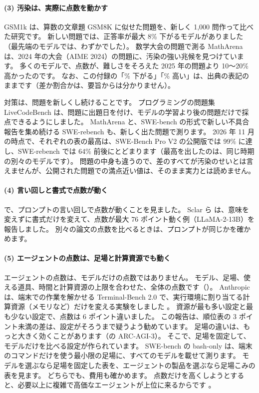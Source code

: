 \paragraph{(3) 汚染は、実際に点数を動かす}
GSM1k \cite{zhang2024gsm1k} は、算数の文章題 GSM8K に似せた問題を、新しく 1,000 問作って比べた研究です。
新しい問題では、正答率が最大 8\% 下がるモデルがありました（最先端のモデルでは、わずかでした）。
数学大会の問題で測る MathArena \cite{balunovic2025matharena} は、2024 年の大会（AIME 2024）の問題に、汚染の強い兆候を見つけています。
多くのモデルで、点数が、難しさをそろえた 2025 年の問題より 10〜20\% 高かったのです。
なお、この付録の「\% 下がる」「\% 高い」は、出典の表記のままです（差か割合かは、要旨からは分かりません）。

対策は、問題を新しくし続けることです。
プログラミングの問題集 LiveCodeBench は、問題に出題日を付け、モデルの学習より後の問題だけで採点できるようにしました。
MathArena と、SWE-bench の形式で新しい不具合報告を集め続ける SWE-rebench も、新しく出た問題で測ります。
2026 年 11 月の時点で、それぞれの表の最高は、SWE-Bench Pro V2 の公開版では 99\% に達し、SWE-rebench では 64\% 前後にとどまります（最高を出したのは、同じ時期の別々のモデルです）。
問題の中身も違うので、差のすべてが汚染のせいとは言えませんが、公開された問題での満点近い値は、そのまま実力とは読めません。

\paragraph{(4) 言い回しと書式で点数が動く}
で、プロンプトの言い回しで点数が動くことを見ました。
Sclar ら \cite{sclar2023sensitivity} は、意味を変えずに書式だけを変えて、点数が最大 76 ポイント動く例（LLaMA-2-13B）を報告しました。
別々の論文の点数を比べるときは、プロンプトが同じかを確かめます。

\paragraph{(5) エージェントの点数は、足場と計算資源でも動く}
エージェントの点数は、モデルだけの点数ではありません。
モデル、足場、使える道具、時間と計算資源の上限を合わせた、全体の点数です（）。
Anthropic は、端末での作業を解かせる Terminal-Bench 2.0 で、実行環境に割り当てる計算資源（メモリなど）だけを変える実験をしました \cite{anthropic2026infranoise}。
資源が最も多い設定と最も少ない設定で、点数は 6 ポイント違いました。
この報告は、順位表の 3 ポイント未満の差は、設定がそろうまで疑うよう勧めています。
足場の違いは、もっと大きく効くことがあります（の ARC-AGI-3）。
そこで、足場を固定して、モデルだけを比べる設定が作られています。
SWE-bench の bash-only は、端末のコマンドだけを使う最小限の足場に、すべてのモデルを載せて測ります。
モデルを選ぶなら足場を固定した表を、エージェントの製品を選ぶなら足場こみの表を見ます。
どちらでも、費用も確かめます。
点数だけを高くしようとすると、必要以上に複雑で高価なエージェントが上位に来るからです \cite{kapoor2024agents}。

